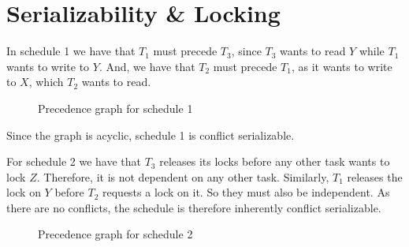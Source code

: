 
\section{Serializability \& Locking}

\begin{multicols}{2}
    In schedule 1 we have that $T_1$ must precede $T_3$, since $T_3$ wants to
    read $Y$ while $T_1$ wants to write to $Y$. And, we have that $T_2$ must
    precede $T_1$, as it wants to write to $X$, which $T_2$ wants to read.
    \begin{figure}[H]
        \centering
        \caption{Precedence graph for schedule 1}
        \label{fig:trans-schedule-1}
    \end{figure}
    Since the graph is acyclic, schedule 1 is conflict serializable.

    \colbreak

    For schedule 2 we have that $T_3$ releases its locks before any other task
    wants to lock $Z$. Therefore, it is not dependent on any other task.
    Similarly, $T_1$ releases the lock on $Y$ before $T_2$ requests a lock on
    it. So they must also be independent. As there are no conflicts, the
    schedule is therefore inherently conflict serializable.
    \begin{figure}[H]
        \centering
        \caption{Precedence graph for schedule 2}
        \label{fig:trans-schedule-2}
    \end{figure}

\end{multicols}
